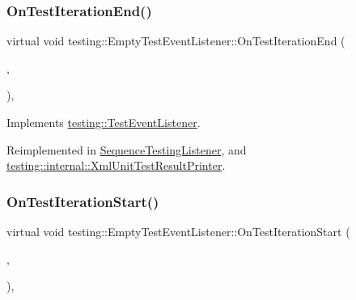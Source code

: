 \subsubsection{\texorpdfstring{On\+Test\+Iteration\+End()}{OnTestIterationEnd()}}
{\footnotesize\ttfamily virtual void testing\+::\+Empty\+Test\+Event\+Listener\+::\+On\+Test\+Iteration\+End (\begin{DoxyParamCaption}\item[{const \hyperlink{classtesting_1_1_unit_test}{Unit\+Test} \&}]{,  }\item[{int}]{ }\end{DoxyParamCaption})\hspace{0.3cm}{\ttfamily [inline]}, {\ttfamily [virtual]}}



Implements \hyperlink{classtesting_1_1_test_event_listener_a550fdb3e55726e4cefa09f5697941425}{testing\+::\+Test\+Event\+Listener}.



Reimplemented in \hyperlink{class_sequence_testing_listener_a783bc01e2a95f5bf73bbde4d96832e0f}{Sequence\+Testing\+Listener}, and \hyperlink{classtesting_1_1internal_1_1_xml_unit_test_result_printer_a2ae986dd2f4f2aed31cc6f3bc8c56898}{testing\+::internal\+::\+Xml\+Unit\+Test\+Result\+Printer}.

\mbox{\label{classtesting_1_1_empty_test_event_listener_a836f05829855dc60d13ba99ad712c0dd}} 
\subsubsection{\texorpdfstring{On\+Test\+Iteration\+Start()}{OnTestIterationStart()}}
{\footnotesize\ttfamily virtual void testing\+::\+Empty\+Test\+Event\+Listener\+::\+On\+Test\+Iteration\+Start (\begin{DoxyParamCaption}\item[{const \hyperlink{classtesting_1_1_unit_test}{Unit\+Test} \&}]{,  }\item[{int}]{ }\end{DoxyParamCaption})\hspace{0.3cm}{\ttfamily [inline]}, {\ttfamily [virtual]}}



